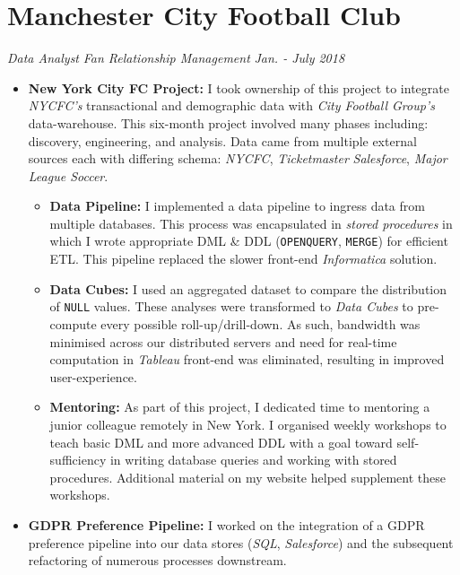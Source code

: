 \documentclass[letterpaper,11pt]{article}
\begin{document}
\section{Manchester City Football Club}
\textit{Data Analyst}
\hfill
\textit{Fan Relationship Management}
\hfill
\textit{Jan. - July 2018}
\begin{itemize}
	\item
	      {
	      \textbf{New York City FC Project:}
	      I took ownership of this project to integrate \textit{NYCFC's} transactional and demographic data with \textit{City Football Group's} data-warehouse. This six-month project involved many phases including: discovery, engineering, and analysis. Data came from multiple external sources each with differing schema: \textit{NYCFC}, \textit{Ticketmaster} \textit{Salesforce}, \textit{Major League Soccer}.
	      \begin{itemize}
		      \item
		            {
		            \textbf{Data Pipeline:}
		            I implemented a data pipeline to ingress data from multiple databases.
		            This process was encapsulated in \textit{stored procedures} in which I wrote appropriate DML \& DDL (\texttt{OPENQUERY}, \texttt{MERGE}) for efficient ETL.
		            This pipeline replaced the slower front-end  \textit{Informatica} solution.
		            }
		      \item
		            {
		            \textbf{Data Cubes:}
		            I used an aggregated dataset to compare the distribution of \texttt{NULL} values. These analyses were transformed to \textit{Data Cubes} to pre-compute every possible roll-up/drill-down. As such, bandwidth was minimised across our distributed servers and need for real-time computation in \textit{Tableau} front-end was eliminated, resulting in improved user-experience.
		            }
		      \item
		            {
		            \textbf{Mentoring:}
		            As part of this project, I dedicated time to mentoring a junior colleague remotely in New York. I organised weekly workshops to teach basic DML and more advanced DDL with a goal toward self-sufficiency in writing database queries and working with stored procedures. Additional material on my website helped supplement these workshops.
		            }
	      \end{itemize}
	      }
	\item
	      {
	      \textbf{GDPR Preference Pipeline:}
	      I worked on the integration of a GDPR preference pipeline into our data stores (\textit{SQL}, \textit{Salesforce}) and the subsequent refactoring of numerous processes downstream.
}
\end{itemize}
\end{document}
